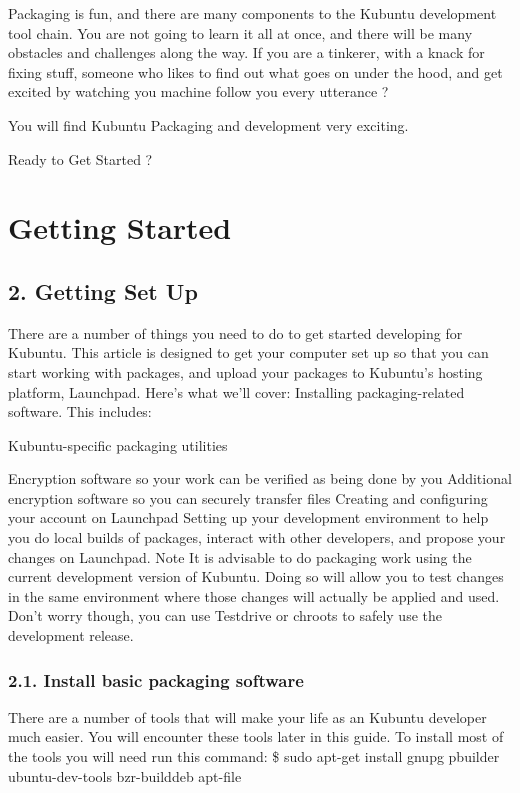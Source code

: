 \documentclass[letterpaper,10pt,english]{sphinxmanual}
\begin{document}
Packaging is fun, and there are many components to the Kubuntu development tool chain. You are not going to learn it all at once, and there will be many obstacles and challenges along the way.
If you are a tinkerer, with a knack for fixing stuff, someone who likes to find out what goes on under the hood, and get excited by watching you machine follow you every utterance ?

You will find Kubuntu Packaging and development very exciting.

Ready to Get Started ?


\section{Getting Started}
\label{\detokenize{docs/packaging_guide/getting_started::doc}}\label{\detokenize{docs/packaging_guide/getting_started:getting-started}}

\subsection{2. Getting Set Up}
\label{\detokenize{docs/packaging_guide/getting_started:getting-set-up}}
There are a number of things you need to do to get started developing for Kubuntu. This article is designed to get your computer set up so that you can start working with packages, and upload your packages to Kubuntu’s hosting platform, Launchpad. Here’s what we’ll cover:
Installing packaging-related software. This includes:

Kubuntu-specific packaging utilities

Encryption software so your work can be verified as being done by you
Additional encryption software so you can securely transfer files
Creating and configuring your account on Launchpad
Setting up your development environment to help you do local builds of packages, interact with other developers, and propose your changes on Launchpad.
Note
It is advisable to do packaging work using the current development version of Kubuntu. Doing so will allow you to test changes in the same environment where those changes will actually be applied and used.
Don’t worry though, you can use Testdrive or chroots to safely use the development release.


\subsubsection{2.1. Install basic packaging software}
\label{\detokenize{docs/packaging_guide/getting_started:install-basic-packaging-software}}
There are a number of tools that will make your life as an Kubuntu developer much easier. You will encounter these tools later in this guide. To install most of the tools you will need run this command:
\$ sudo apt-get install gnupg pbuilder ubuntu-dev-tools bzr-builddeb apt-file
\end{document}
